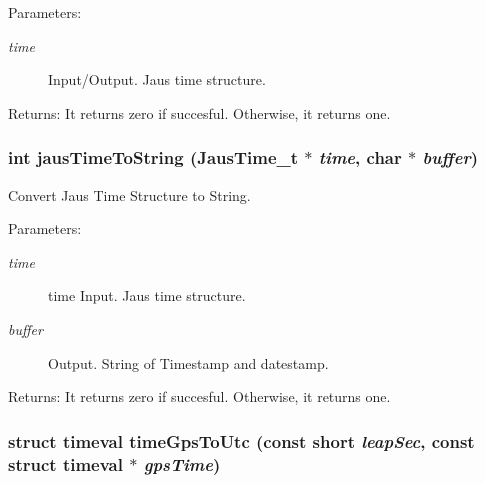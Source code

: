 \begin{Desc}
\item[Parameters:]
\begin{description}
\item[{\em time}]Input/Output. Jaus time structure.\end{description}
\end{Desc}
\begin{Desc}
\item[Returns:]It returns zero if succesful. Otherwise, it returns one. \end{Desc}
\hypertarget{group__time__conv_g0e70191e4545f9180f005c013a8573a0}{
\subsubsection[jausTimeToString]{\setlength{\rightskip}{0pt plus 5cm}int jausTimeToString ({\bf JausTime\_\-t} $\ast$ {\em time}, \/  char $\ast$ {\em buffer})}}
\label{group__time__conv_g0e70191e4545f9180f005c013a8573a0}


Convert Jaus Time Structure to String. 

\begin{Desc}
\item[Parameters:]
\begin{description}
\item[{\em time}]time Input. Jaus time structure. \item[{\em buffer}]Output. String of Timestamp and datestamp.\end{description}
\end{Desc}
\begin{Desc}
\item[Returns:]It returns zero if succesful. Otherwise, it returns one. \end{Desc}
\hypertarget{group__time__conv_gdc88a6af3e3644ef9874e2cb55aa1976}{
\subsubsection[timeGpsToUtc]{\setlength{\rightskip}{0pt plus 5cm}struct timeval timeGpsToUtc (const short {\em leapSec}, \/  const struct timeval $\ast$ {\em gpsTime})}}
\label{group__time__conv_gdc88a6af3e3644ef9874e2cb55aa1976}


